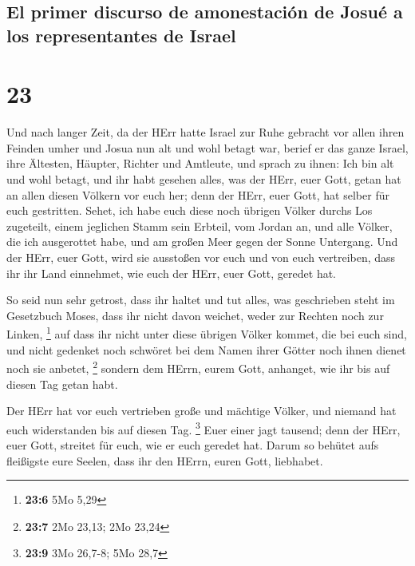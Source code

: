 \hypertarget{el-primer-discurso-de-amonestaciuxf3n-de-josuuxe9-a-los-representantes-de-israel}{%
\subsection{El primer discurso de amonestación de Josué a los
representantes de
Israel}\label{el-primer-discurso-de-amonestaciuxf3n-de-josuuxe9-a-los-representantes-de-israel}}

\hypertarget{section-22}{%
\section{23}\label{section-22}}

 Und nach langer Zeit, da der HErr hatte Israel zur Ruhe
gebracht vor allen ihren Feinden umher und Josua nun alt und wohl betagt
war,  berief er das ganze Israel, ihre Ältesten, Häupter,
Richter und Amtleute, und sprach zu ihnen: Ich bin alt und wohl betagt,
 und ihr habt gesehen alles, was der HErr, euer Gott,
getan hat an allen diesen Völkern vor euch her; denn der HErr, euer
Gott, hat selber für euch gestritten.  Sehet, ich habe
euch diese noch übrigen Völker durchs Los zugeteilt, einem jeglichen
Stamm sein Erbteil, vom Jordan an, und alle Völker, die ich ausgerottet
habe, und am großen Meer gegen der Sonne Untergang.  Und
der HErr, euer Gott, wird sie ausstoßen vor euch und von euch
vertreiben, dass ihr ihr Land einnehmet, wie euch der HErr, euer Gott,
geredet hat.

 So seid nun sehr getrost, dass ihr haltet und tut alles,
was geschrieben steht im Gesetzbuch Moses, dass ihr nicht davon weichet,
weder zur Rechten noch zur Linken, \footnote{\textbf{23:6} 5Mo 5,29}
 auf dass ihr nicht unter diese übrigen Völker kommet, die
bei euch sind, und nicht gedenket noch schwöret bei dem Namen ihrer
Götter noch ihnen dienet noch sie anbetet, \footnote{\textbf{23:7} 2Mo
  23,13; 2Mo 23,24}  sondern dem HErrn, eurem Gott,
anhanget, wie ihr bis auf diesen Tag getan habt.

 Der HErr hat vor euch vertrieben große und mächtige
Völker, und niemand hat euch widerstanden bis auf diesen Tag.
\footnote{\textbf{23:9} 3Mo 26,7-8; 5Mo 28,7}  Euer einer
jagt tausend; denn der HErr, euer Gott, streitet für euch, wie er euch
geredet hat.  Darum so behütet aufs fleißigste eure
Seelen, dass ihr den HErrn, euren Gott, liebhabet.

